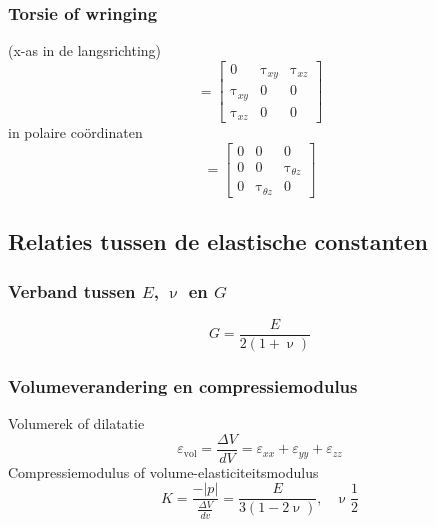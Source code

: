             \subsubsection{Torsie of wringing}

                (x-as in de langsrichting)
                \begin{equation}
                    [\upsigma] = \left[\begin{matrix}
                        0 & \uptau_{xy} & \uptau_{xz} \\
                        \uptau_{xy} & 0 & 0 \\
                        \uptau_{xz} & 0 & 0
                    \end{matrix}\right]
                \end{equation}
                in polaire coördinaten
                \begin{equation}
                    [\upsigma] = \left[\begin{matrix}
                        0 & 0 & 0 \\
                        0 & 0 & \uptau_{\theta z} \\
                        0 & \uptau_{\theta z} & 0
                    \end{matrix}\right]
                \end{equation}
            
            \subsection{Relaties tussen de elastische constanten}
                
                \subsubsection{Verband tussen $E$, $\upnu$ en $G$}

                    \begin{equation}
                        G=\frac{E}{2(1+\upnu)}
                    \end{equation}

            \subsubsection{Volumeverandering en compressiemodulus}

                Volumerek of dilatatie
                \begin{equation}
                    \varepsilon_{\text{vol}} = \frac{\Delta V}{dV} = \varepsilon_{xx} + \varepsilon_{yy} + \varepsilon_{zz}
                \end{equation}
                Compressiemodulus of volume-elasticiteitsmodulus
                \begin{equation}
                    K = \frac{-|p|}{\frac{\Delta V}{dv}} = \frac{E}{3(1-2\upnu)}, \;\;\; \upnu \frac{1}{2}
                \end{equation}

